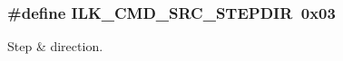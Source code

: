 \subsubsection[{\texorpdfstring{I\+L\+K\+\_\+\+C\+M\+D\+\_\+\+S\+R\+C\+\_\+\+S\+T\+E\+P\+D\+IR}{ILK_CMD_SRC_STEPDIR}}]{\setlength{\rightskip}{0pt plus 5cm}\#define I\+L\+K\+\_\+\+C\+M\+D\+\_\+\+S\+R\+C\+\_\+\+S\+T\+E\+P\+D\+IR~0x03}\hypertarget{group__IL__CONST__CMD__SRC_ga65139db060bb9ccf75324070aac63635}{}\label{group__IL__CONST__CMD__SRC_ga65139db060bb9ccf75324070aac63635}


Step \& direction. 

